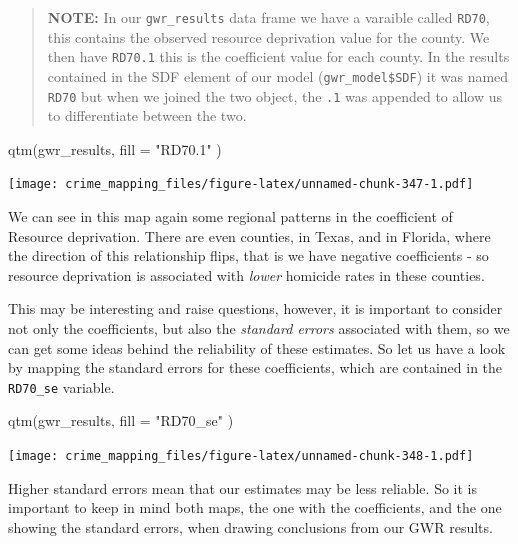 \documentclass[
  krantz2]{krantz}
\makeatletter
\newenvironment{Shaded}{\begin{snugshade}}{\end{snugshade}}
\newcommand{\AttributeTok}[1]{\textcolor[rgb]{0.61,0.61,0.61}{#1}}
\newcommand{\FunctionTok}[1]{\textcolor[rgb]{0,0,0}{#1}}
\newcommand{\NormalTok}[1]{#1}
\newcommand{\StringTok}[1]{\textcolor[rgb]{0.5,0.5,0.5}{#1}}
\newenvironment{kframe}{%
\medskip{}
\setlength{\fboxsep}{.8em}
 \def\at@end@of@kframe{}%
 \ifinner\ifhmode%
  \def\at@end@of@kframe{\end{minipage}}%
  \begin{minipage}{\columnwidth}%
 \fi\fi%
 \def\FrameCommand##1{\hskip\@totalleftmargin \hskip-\fboxsep
 \colorbox{shadecolor}{##1}\hskip-\fboxsep
     \hskip-\linewidth \hskip-\@totalleftmargin \hskip\columnwidth}%
 \MakeFramed {\advance\hsize-\width
   \@totalleftmargin\z@ \linewidth\hsize
   \@setminipage}}%
 {\par\unskip\endMakeFramed%
 \at@end@of@kframe}
\renewenvironment{Shaded}{\begin{kframe}}{\end{kframe}}
\makeatother
\begin{document}
\begin{quote}
\textbf{NOTE:} In our \texttt{gwr\_results} data frame we have a varaible called \texttt{RD70}, this contains the observed resource deprivation value for the county. We then have \texttt{RD70.1} this is the coefficient value for each county. In the results contained in the SDF element of our model (\texttt{gwr\_model\$SDF}) it was named \texttt{RD70} but when we joined the two object, the \texttt{.1} was appended to allow us to differentiate between the two.
\end{quote}

\begin{Shaded}
\begin{Highlighting}[]
\FunctionTok{qtm}\NormalTok{(gwr\_results, }\AttributeTok{fill =}  \StringTok{"RD70.1"}\NormalTok{ )}
\end{Highlighting}
\end{Shaded}

\texttt{[image: crime\_mapping\_files/figure-latex/unnamed-chunk-347-1.pdf]}

We can see in this map again some regional patterns in the coefficient of Resource deprivation. There are even counties, in Texas, and in Florida, where the direction of this relationship flips, that is we have negative coefficients - so resource deprivation is associated with \emph{lower} homicide rates in these counties.

This may be interesting and raise questions, however, it is important to consider not only the coefficients, but also the \emph{standard errors} associated with them, so we can get some ideas behind the reliability of these estimates. So let us have a look by mapping the standard errors for these coefficients, which are contained in the \texttt{RD70\_se} variable.

\begin{Shaded}
\begin{Highlighting}[]
\FunctionTok{qtm}\NormalTok{(gwr\_results, }\AttributeTok{fill =}  \StringTok{"RD70\_se"}\NormalTok{ )}
\end{Highlighting}
\end{Shaded}

\texttt{[image: crime\_mapping\_files/figure-latex/unnamed-chunk-348-1.pdf]}

Higher standard errors mean that our estimates may be less reliable. So it is important to keep in mind both maps, the one with the coefficients, and the one showing the standard errors, when drawing conclusions from our GWR results.
\end{document}

